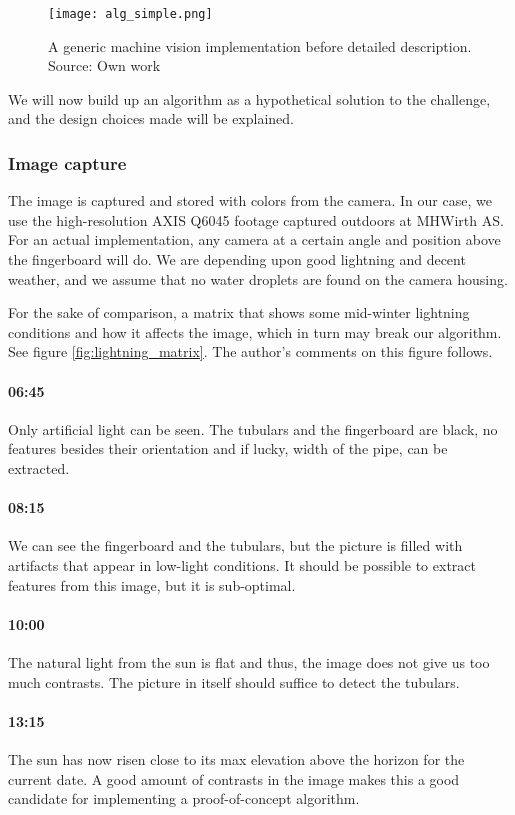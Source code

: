 \begin{figure}[ht]
    \centering
    \texttt{[image: alg\_simple.png]}
    \caption{A generic machine vision implementation before detailed description. Source: Own work}
    \label{fig:alg_simple}
\end{figure}
\FloatBarrier

We will now build up an algorithm as a hypothetical solution to the challenge, and the design choices made will be explained.

\subsubsection{Image capture}
The image is captured and stored with colors from the camera. In our case, we use the high-resolution AXIS Q6045 footage captured outdoors at MHWirth AS. For an actual implementation, any camera at a certain angle and position above the fingerboard will do. We are depending upon good lightning and decent weather, and we assume that no water droplets are found on the camera housing.

For the sake of comparison, a matrix that shows some mid-winter lightning conditions and how it affects the image, which in turn may break our algorithm. See figure \ref{fig:lightning_matrix}. The author's comments on this figure follows.

\paragraph{06:45} Only artificial light can be seen. The tubulars and the fingerboard are black, no features besides their orientation and if lucky, width of the pipe, can be extracted.

\paragraph{08:15} We can see the fingerboard and the tubulars, but the picture is filled with artifacts that appear in low-light conditions. It should be possible to extract features from this image, but it is sub-optimal.

\paragraph{10:00} The natural light from the sun is flat and thus, the image does not give us too much contrasts. The picture in itself should suffice to detect the tubulars.

\paragraph{13:15} The sun has now risen close to its max elevation above the horizon for the current date. A good amount of contrasts in the image makes this a good candidate for implementing a proof-of-concept algorithm.

